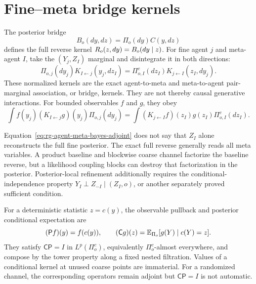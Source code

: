 \section{Fine--meta bridge kernels}
\label{sec:rg-cross-scale-kernels}

The posterior bridge
\begin{equation}
B_o(dy,dz)=\Pi_o(dy)C(y,dz)
\label{eq:rg-posterior-bridge}
\end{equation}
defines the full reverse kernel $R_o(z,dy)=B_o(dy\mid z)$.  For fine agent
$j$ and meta-agent $I$, take the $(Y_j,Z_I)$ marginal and disintegrate it in
both directions:
\begin{equation}
\Pi_{o,j}(dy_j)K_{I\leftarrow j}(y_j,dz_I)
=\Pi_{o,I}^c(dz_I)K_{j\leftarrow I}(z_I,dy_j).
\label{eq:rg-agent-meta-bayes-adjoint}
\end{equation}
These normalized kernels are the exact agent-to-meta and meta-to-agent
pair-marginal association, or bridge, kernels.  They are not thereby causal
generative interactions.  For bounded observables $f$ and $g$,
they obey
\begin{equation}
\int f(y_j)(K_{I\leftarrow j}g)(y_j)\Pi_{o,j}(dy_j)
=\int (K_{j\leftarrow I}f)(z_I)g(z_I)\Pi_{o,I}^c(dz_I).
\label{eq:rg-agent-meta-adjointness}
\end{equation}

Equation~\eqref{eq:rg-agent-meta-bayes-adjoint} does not say that $Z_I$ alone
reconstructs the full fine posterior.  The exact full reverse generally reads
all meta variables.  A product baseline and blockwise coarse channel factorize
the baseline reverse, but a likelihood coupling blocks can destroy that
factorization in the posterior.  Posterior-local refinement additionally
requires the conditional-independence property
$Y_I\perp Z_{-I}\mid(Z_I,o)$, or another separately proved sufficient
condition.  

For a deterministic statistic $z=c(y)$, the observable pullback and posterior
conditional expectation are
\begin{equation}
(\mathsf P f)(y)=f(c(y)),
\qquad
(\mathsf Cg)(z)=\mathbb E_{\Pi_o}[g(Y)\mid c(Y)=z].
\label{eq:rg-conditional-operators}
\end{equation}
They satisfy $\mathsf C\mathsf P=I$ in $L^p(\Pi_o^c)$, equivalently
$\Pi_o^c$-almost everywhere, and compose by the tower property along a fixed
nested filtration.  Values of a conditional kernel at unused coarse points
are immaterial.  For a randomized channel, the corresponding
operators remain adjoint but $\mathsf C\mathsf P=I$ is not automatic.


